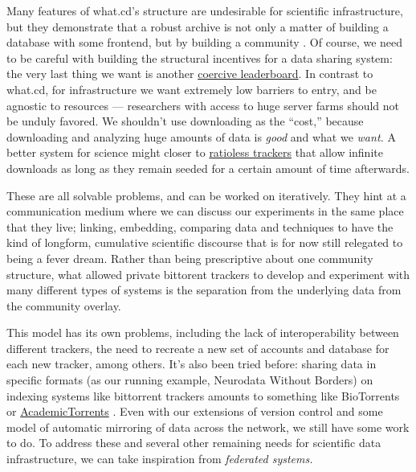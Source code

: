 \documentclass[11pt]{article}
\begin{document}
\begin{multicols}{2}
Many features of what.cd's structure are undesirable for scientific
infrastructure, but they demonstrate that a robust archive is not only a
matter of building a database with some frontend, but by building a
community \cite{brossCommunityCollaborationContribution2013} . Of
course, we need to be careful with building the structural incentives
for a data sharing system: the very last thing we want is another
\href{https://etiennelebel.com/cs/t-leaderboard/t-leaderboard.html}{coercive
leaderboard}. In contrast to what.cd, for infrastructure we want
extremely low barriers to entry, and be agnostic to resources ---
researchers with access to huge server farms should not be unduly
favored. We shouldn't use downloading as the ``cost,'' because
downloading and analyzing huge amounts of data is \emph{good} and what
we \emph{want.} A better system for science might closer to
\href{https://wiki.installgentoo.com/wiki/Private_trackers\#No_economy}{ratioless
trackers} that allow infinite downloads as long as they remain seeded
for a certain amount of time afterwards.

These are all solvable problems, and can be worked on iteratively. They
hint at a communication medium where we can discuss our experiments in
the same place that they live; linking, embedding, comparing data and
techniques to have the kind of longform, cumulative scientific discourse
that is for now still relegated to being a fever dream. Rather than
being prescriptive about one community structure, what allowed private
bittorent trackers to develop and experiment with many different types
of systems is the separation from the underlying data from the community
overlay.

This model has its own problems, including the lack of interoperability
between different trackers, the need to recreate a new set of accounts
and database for each new tracker, among others. It's also been tried
before: sharing data in specific formats (as our running example,
Neurodata Without Borders) on indexing systems like bittorrent trackers
amounts to something like BioTorrents \cite{langilleBioTorrentsFileSharing2010}  or
\href{https://academictorrents.com/}{AcademicTorrents} \cite{cohenAcademicTorrentsCommunityMaintained2014} . Even with our
extensions of version control and some model of automatic mirroring of
data across the network, we still have some work to do. To address these
and several other remaining needs for scientific data infrastructure, we
can take inspiration from \emph{federated systems.}


\end{multicols}
\end{document}
